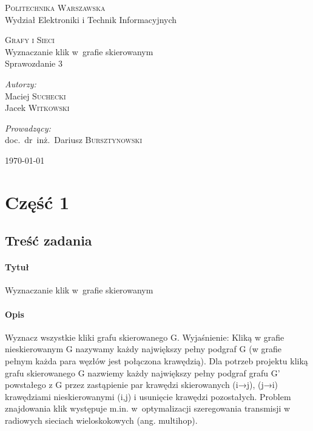 \documentclass[11pt,a4paper]{article}
\begin{document}
\begin{titlepage}
  \begin{center}

    \textsc{\Large Politechnika Warszawska}\\[0.1cm]
    \small Wydział Elektroniki i Technik Informacyjnych
    \vfill

    \textsc{\small Grafy i Sieci}\\[0.1cm]
    \Huge Wyznaczanie klik w~grafie skierowanym\\[1.5cm]
    \small Sprawozdanie 3\\[2.5cm]

    \vfill

    \begin{minipage}{0.4\textwidth}
      \begin{flushleft} \large
        \emph{Autorzy:}\\[0.1cm]
        Maciej \textsc{Suchecki}\\
        Jacek \textsc{Witkowski}\\
      \end{flushleft}
    \end{minipage}
    \begin{minipage}{0.4\textwidth}
      \begin{flushright} \large
        \emph{Prowadzący:}\\[0.1cm]
        doc.~dr~inż.~Dariusz \textsc{Bursztynowski}\\[1cm]
      \end{flushright}
    \end{minipage}

    \vfill
    {\large \today}

  \end{center}
\end{titlepage}

\section{Część 1}
\subsection{Treść zadania}
\paragraph{Tytuł} Wyznaczanie klik w~grafie skierowanym
\paragraph{Opis} Wyznacz wszystkie kliki grafu skierowanego G. Wyjaśnienie: Kliką w grafie nieskierowanym G nazywamy każdy największy pełny podgraf G (w grafie pełnym każda para węzłów jest połączona krawędzią). Dla potrzeb projektu kliką grafu skierowanego G nazwiemy każdy największy pełny podgraf grafu G’ powstałego z G przez zastąpienie par krawędzi skierowanych (i→j), (j→i) krawędziami nieskierowanymi (i,j) i usunięcie krawędzi pozostałych. Problem znajdowania klik występuje m.in. w~optymalizacji szeregowania transmisji w radiowych sieciach wieloskokowych (ang. multihop).
\end{document}
